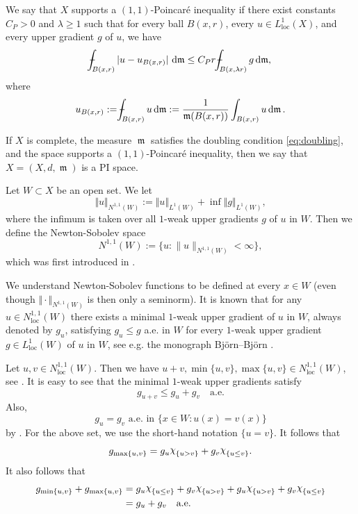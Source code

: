 \documentclass[11pt]{article}
\numberwithin{equation}{section}
\theoremstyle{plain}
\theoremstyle{definition}
\numberwithin{equation}{section}
\providecommand{\vint}[1]{\mathchoice
          {\mathop{\vrule width 5pt height 3 pt depth -2.5pt
                  \kern -9pt \kern 1pt\intop}\nolimits_{\kern -5pt{#1}}}
          {\mathop{\vrule width 5pt height 3 pt depth -2.6pt
                  \kern -6pt \intop}\nolimits_{\kern -3pt{#1}}}
          {\mathop{\vrule width 5pt height 3 pt depth -2.6pt
                  \kern -6pt \intop}\nolimits_{\kern -3pt{#1}}}
          {\mathop{\vrule width 5pt height 3 pt depth -2.6pt
                  \kern -6pt \intop}\nolimits_{\kern -3pt{#1}}}}
\newcommand{\loc}{\mathrm{loc}}
\newcommand{\ch}{\text{\raise 1.3pt \hbox{$\chi$}\kern-0.2pt}}
\DeclareMathOperator{\frm}{\mathfrak{m}}
\DeclareMathOperator{\dfrm}{d\mathfrak{m}}
\begin{document}
We say that $X$ supports a $(1,1)$-Poincar\'e inequality
if there exist constants $C_P>0$ and $\lambda \ge 1$ such that for every
ball $B(x,r)$, every $u\in L^1_{\loc}(X)$,
and every upper gradient $g$ of $u$,
we have
\[
\vint{B(x,r)}|u-u_{B(x,r)}|\, \dfrm 
\le C_P r\vint{B(x,\lambda r)}g\dfrm,
\]
where 
\[
u_{B(x,r)}:=\vint{B(x,r)}u\dfrm :=\frac 1{\frm(B(x,r))}\int_{B(x,r)}u\dfrm.
\]

If $X$ is complete, the measure $\frm$ satisfies the doubling condition \eqref{eq:doubling},
and the space supports a $(1,1)$-Poincar\'e inequality,
then we say that $X=(X,d,\frm)$ is a PI space.

Let $W\subset X$ be an open set. We let
\[
\Vert u\Vert_{N^{1,1}(W)}:=\Vert u\Vert_{L^1(W)}+\inf \Vert g\Vert_{L^1(W)},
\]
where the infimum is taken over all $1$-weak upper gradients $g$ of $u$ in $W$.
Then we define the Newton-Sobolev space
\[
N^{1,1}(W):=\{u\colon \|u\|_{N^{1,1}(W)}<\infty\},
\]
which was first introduced in \cite{S}.

We understand Newton-Sobolev functions to be defined at every $x\in W$
(even though $\Vert \cdot\Vert_{N^{1,1}(W)}$ is then only a seminorm).
It is known that for any $u\in N_{\loc}^{1,1}(W)$ there exists a minimal $1$-weak
upper gradient of $u$ in $W$, always denoted by $g_{u}$, satisfying $g_{u}\le g$ 
a.e. in $W$ for every $1$-weak upper gradient $g\in L_{\loc}^{1}(W)$
of $u$ in $W$, see e.g. the monograph Bj\"orn--Bj\"orn \cite[Theorem 2.25]{BB}.

Let $u,v \in N_{\loc}^{1,1}(W)$.
Then we have $u+v,\min\{u,v\},\max\{u,v\}\in N^{1,1}_{\loc}(W)$, see
\cite[Theorem 1.20]{BB}.
It is easy to see that the minimal $1$-weak upper gradients satisfy
\begin{equation}\label{eq:sum upper gradient}
g_{u+v}\le g_u+g_v\quad\textrm{a.e.}
\end{equation}
Also, 
\begin{equation}\label{eq:upper gradient locality}
g_u=g_v \textrm{ a.e. in }\{x \in W\colon  u(x)=v(x)\}
\end{equation}
by \cite[Corollary 2.21]{BB}.
For the above set, we use the short-hand notation $\{u=v\}$.
It follows that
\begin{equation}\label{eq:max upper gradient}
g_{\max\{u,v\}}=g_{u}\ch_{\{u>v\}}+g_{v}\ch_{\{u\le v\}}.
\end{equation}
It also follows that
\begin{equation}\label{eq:min max upper gradient}
\begin{split}
g_{\min\{u,v\}}+g_{\max\{u,v\}}
&=g_u\ch_{\{u\le v\}}+g_v\ch_{\{u> v\}}+g_u\ch_{\{u> v\}}+g_v\ch_{\{u\le v\}}\\
&=g_u+g_v\quad\textrm{a.e.}
\end{split}
\end{equation}
\end{document}
